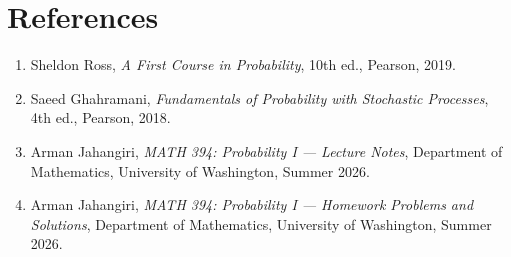 \documentclass[11pt]{article}
\begin{document}
 

\newpage
\section*{References}

\begin{enumerate}
    \item Sheldon Ross,
    \textit{A First Course in Probability},
    10th ed.,
    Pearson, 2019.

    \item Saeed Ghahramani,
    \textit{Fundamentals of Probability with Stochastic Processes},
    4th ed.,
    Pearson, 2018.


        \item Arman Jahangiri,
    \textit{MATH 394: Probability I --- Lecture Notes},
    Department of Mathematics,
    University of Washington,
    Summer 2026.

    \item Arman Jahangiri,
    \textit{MATH 394: Probability I --- Homework Problems and Solutions},
    Department of Mathematics,
    University of Washington,
    Summer 2026.
\end{enumerate}
\end{document}
